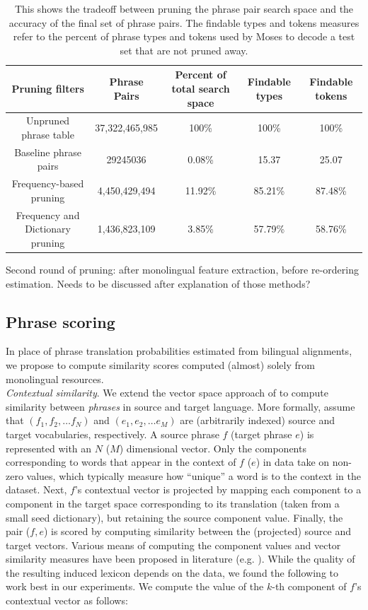 \documentclass[11pt]{article}
\begin{document}
\begin{table}
\small
\begin{center}
\label{table:prune}
\begin{tabular}{|c|c|c|c|c|}
\hline
Pruning filters & Phrase Pairs & Percent of total search space & Findable types & Findable tokens \\
\hline
Unpruned phrase table & 37,322,465,985 & 100\% & 100\% & 100\% \\
Baseline phrase pairs & 29245036 & 0.08\% & 15.37 & 25.07 \\
Frequency-based pruning & 4,450,429,494 & 11.92\% & 85.21\% & 87.48\% \\
Frequency and Dictionary pruning & 1,436,823,109 & 3.85\% & 57.79\% & 58.76\% \\
\hline
\end{tabular}
\caption{This shows the tradeoff between pruning the phrase pair search space and the accuracy of the final set of phrase pairs. The findable types and tokens measures refer to the percent of phrase types and tokens used by Moses to decode a test set that are not pruned away.}
\end{center}
\end{table}


Second round of pruning: after monolingual feature extraction, before re-ordering estimation. Needs to be discussed after explanation of those methods? 

\subsection{Phrase scoring} \label{sect:score}

In place of phrase translation probabilities estimated from bilingual alignments, we propose to compute similarity scores computed (almost) solely from monolingual resources.\\

\noindent\emph{Contextual similarity}.  We extend the vector space approach of \cite{Rapp:1999} to compute similarity between \emph{phrases} in source and target language.  More formally, assume that $(f_{1}, f_{2}, \dots f_{N})$ and $(e_{1}, e_{2}, \dots e_{M})$ are (arbitrarily indexed) source and target vocabularies, respectively.  A source phrase $f$ (target phrase $e$) is represented with an $N$ ($M$) dimensional vector.  Only the components corresponding to words that appear in the context of $f$ ($e$) in data take on non-zero values, which typically measure how ``unique'' a word is to the context in the dataset.  Next, $f$'s contextual vector is projected by mapping each component to a component in the target space corresponding to its translation (taken from a small seed dictionary), but retaining the source component value.  Finally, the pair ($f, e$) is scored by computing similarity between the (projected) source and target vectors.  Various means of computing the component values and vector similarity measures have been proposed in literature (e.g. \cite{Rapp:1999,Fung:1998}).  While the quality of the resulting induced lexicon depends on the data, we found the following to work best in our experiments.  We compute the value of the $k$-th component of $f$'s contextual vector  as follows: 
\end{document}
